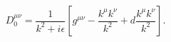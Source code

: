 \begin{equation}
D_{0}^{\mu\nu}=\frac{1}{k^{2}+i\epsilon}[g^{\mu\nu}-\frac{k^{\mu}k^{\nu}%
}{k^{2}}+d\frac{k^{\mu}k^{\nu}}{k^{2}}].
\end{equation}


